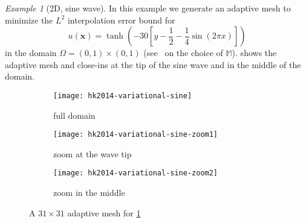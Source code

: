\documentclass[american]{scrartcl}
\providecommand{\V}[1]{\boldsymbol{#1}}
\providecommand{\M}{\mathbb{M}}
\theoremstyle{remark}
\newtheorem{example}{\hspace{1ex}Example}[section]
\begin{document}
\begin{example}[2D, sine wave]
\label{ex:2d:sin}
In this example we generate an adaptive mesh to minimize the $L^2$ interpolation error bound for
\[
   u(\V{x}) = \tanh \left(
      -30 \left[ y - \frac{1}{2} - \frac{1}{4} \sin\left(2 \pi x\right) \right] \right)
\]
in the domain $\Omega = (0,1) \times (0,1)$ (see~\cite[Sect.~3.2]{Hua02b} on the choice of $\M$).
 shows the adaptive mesh and close-ins at the tip of the sine wave and in the middle of the domain.

\begin{figure}[p]
   \begin{subfigure}[t]{0.31\linewidth}
      \texttt{[image: hk2014-variational-sine]}      \caption{full domain}
   \end{subfigure}   \hfill   \begin{subfigure}[t]{0.31\linewidth}
      \texttt{[image: hk2014-variational-sine-zoom1]}      \caption{zoom at the wave tip}
   \end{subfigure}   \hfill   \begin{subfigure}[t]{0.31\linewidth}
      \texttt{[image: hk2014-variational-sine-zoom2]}      \caption{zoom in the middle}
   \end{subfigure}
   \caption{      A $31 \times 31$ adaptive mesh for \cref{ex:2d:sin}
   }\label{fig:2d:sin}
\end{figure}

\end{example}
\end{document}
